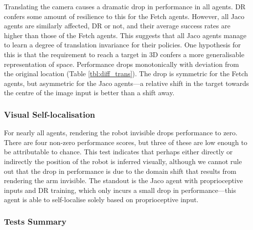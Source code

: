 Translating the camera causes a dramatic drop in performance in all
agents. DR confers some amount of resilience to this for the Fetch
agents. However, all Jaco agents are similarly affected, DR or not, and
their average success rates are higher than those of the Fetch agents.
This suggests that all Jaco agents manage to learn a degree of
translation invariance for their policies. One hypothesis for this is
that the requirement to reach a target in 3D confers a more
generalisable representation of space. Performance drops monotonically
with deviation from the original location (Table \ref{tbl:diff_trans}).
The drop is symmetric for the Fetch agents, but asymmetric for the Jaco
agents---a relative shift in the target towards the centre of the image
input is better than a shift away.

\hypertarget{visual-self-localisation}{%
\subsubsection{Visual
Self-localisation}\label{visual-self-localisation}}

\label{sec:vis_self_loc}

For nearly all agents, rendering the robot invisible drops performance
to zero. There are four non-zero performance scores, but three of these
are low enough to be attributable to chance. This test indicates that
perhaps either directly or indirectly the position of the robot is
inferred visually, although we cannot rule out that the drop in
performance is due to the domain shift that results from rendering the
arm invisible. The standout is the Jaco agent with proprioceptive inputs
and DR training, which only incurs a small drop in performance---this
agent is able to self-localise solely based on proprioceptive input.

\hypertarget{tests-summary}{%
\subsubsection{Tests Summary}\label{tests-summary}}

